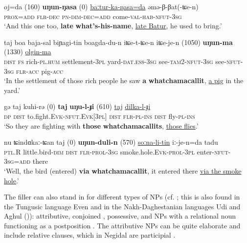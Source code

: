 \documentclass[output=paper]{langscibook}
\begin{document}
\ea \label{ex:pakendorf:21}
\gll oj=da
	\textup{(160)} 
	\textbf{uŋun-ŋasa}
	\textup{(0)}
	\uline{baːtur-ka-ŋasa=da}
	əmə-β-βat(-ʨe-n)\\
     \textsc{prox=add}
     {}
     \textsc{flr-dec}
     {}
     \textsc{pn-dim-dec=add}
     come-\textsc{val-hab-nfut-3sg}\\
\glt ‘And this one too, \textbf{late} \textbf{what’s-his-name}, \uline{late Batur}, he used to bring.’ 
\z


\ea \label{ex:pakendorf:22}
\gll taj
	boa
	baja-sal
	biɲagi-tin
	boagda-du-n
	iʨe-t-ʨe-n
	iʨe-je-n
	\textup{(1050)}
	\textbf{uŋun-ma}
	\textup{(1330)}
	\uline{olgin-ma}\\
     \textsc{dist}
     \textsc{fs}
     rich-\textsc{pl.hum}
     settlement-\textsc{3pl}
     yard-\textsc{dat.ess-3sg}
     see-\textsc{tam2-nfut-3sg}
     see-\textsc{nfut-3sg}
     {}
     \textsc{flr-acc}
     {}
     pig-\textsc{acc}\\
\glt ‘In the settlement of those rich people he saw \textbf{a} \textbf{whatchamacallit}, \uline{a pig} in the yard.’ 
\z


\ea \label{ex:pakendorf:23}
\gll gə
	taj
	kuhi-rə
	\textup{(0)}
	\textbf{taj}
	\textbf{uŋu-l-ɟi}
	\textup{(610)}
	\uline{taj}
	\uline{dilka-l-ɟi}\\
     \textsc{dp}
     \textsc{dist}
     to.fight.\textsc{Evk}-\textsc{nfut.Evk[3pl]}
     {}
     \textsc{dist}
     \textsc{flr-pl-ins}
     {}
     \textsc{dist}
     fly-\textsc{pl-ins}\\
\glt ‘So they are fighting with \textbf{those} \textbf{whatchamacallits}, \uline{those flies}.’ 
\z

\ea \label{ex:pakendorf:24}
\gll nu
	ʨindɑkaː-ʨan
	taj
	\textup{(0)}
	\textbf{uŋun-duli-n}
	\textup{(570)}
	\uline{soːna-li-tin}
	iː-je-n=da tadu\\
     \textsc{ptl.}R
     little.bird-\textsc{dim}
     \textsc{dist}
     {}
     \textsc{flr-prol-3sg}
     {}
     smoke.hole.\textsc{Evk}-\textsc{prol-3pl}
     enter-\textsc{nfut-3sg=add}
     there\\
\glt ‘Well, the bird (entered) \textbf{via} \textbf{whatchamacallit}, it entered there \uline{via the smoke hole}.’ 
\z

The filler can also stand in for different types of NPs (cf. \citealt[263]{Schegloff1979}; this is also found in the Tungusic language Even \citep{Matić2008} and in the Nakh-Daghestanian languages Udi and Aghul (\citealt[101]{GanenkovGanenkov2010})): attributive, conjoined , possessive, and NPs with a relational noun functioning as a postposition . The attributive NPs can be quite elaborate and include relative clauses, which in Negidal are participial .
\end{document}
